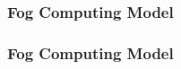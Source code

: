 \documentclass[10pt, pdf, xcolor=pdftex, dvipsnames, table]{beamer}
\begin{document}
\begin{frame}
	\frametitle{Fog Computing Model}
\end{frame}

\begin{frame}
	\frametitle{Fog Computing Model}
\end{frame}
\end{document}
